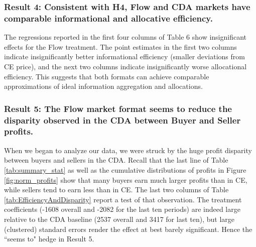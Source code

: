 \subsubsection*{Result 4: Consistent with H4, Flow and CDA markets have comparable  informational and allocative efficiency.}

The regressions reported in the first four columns of Table 6 show insignificant effects for the Flow treatment. The point estimates in the first two columns indicate insignificantly better informational efficiency (smaller deviations from CE price), and the next two columns indicate insignificantly worse allocational efficiency. %
This suggests that both formats can achieve comparable approximations of ideal information aggregation and allocations.


\subsubsection*{Result 5: The Flow market format seems to reduce the disparity observed in the CDA between Buyer and Seller profits.}

When we began to analyze our data, we were struck by the huge profit disparity between buyers and sellers
in the CDA. Recall that the last line of Table \ref{tab:summary_stat} as well as the cumulative distributions of profits in Figure \ref{fig:norm_profits} show that many buyers earn much larger profits than in CE, while sellers tend to earn less than in CE. 
The last two columns of Table \ref{tab:EfficiencyAndDisparity} report a test of that observation.
The treatment coefficients (-1608 overall and -2082 for the last ten periods) are indeed large relative to the CDA baseline (2537 overall and 3417 for last ten), but large (clustered) standard errors render the effect at best barely significant. Hence the ``seems to" 
hedge in Result 5.

